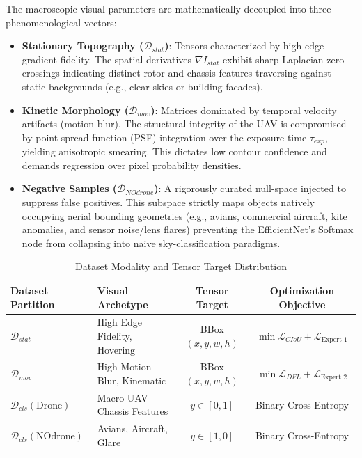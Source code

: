 \documentclass[11pt, letterpaper, oneside, openany]{book}
\begin{document}
The macroscopic visual parameters are mathematically decoupled into three phenomenological vectors:
\begin{itemize}
    \item \textbf{Stationary Topography ($\mathcal{D}_{stat}$)}: Tensors characterized by high edge-gradient fidelity. The spatial derivatives $\nabla I_{stat}$ exhibit sharp Laplacian zero-crossings indicating distinct rotor and chassis features traversing against static backgrounds (e.g., clear skies or building facades).
    \item \textbf{Kinetic Morphology ($\mathcal{D}_{mov}$)}: Matrices dominated by temporal velocity artifacts (motion blur). The structural integrity of the UAV is compromised by point-spread function (PSF) integration over the exposure time $\tau_{exp}$, yielding anisotropic smearing. This dictates low contour confidence and demands regression over pixel probability densities.
    \item \textbf{Negative Samples ($\mathcal{D}_{NOdrone}$)}: A rigorously curated null-space injected to suppress false positives. This subspace strictly maps objects natively occupying aerial bounding geometries (e.g., avians, commercial aircraft, kite anomalies, and sensor noise/lens flares) preventing the EfficientNet's Softmax node from collapsing into naive sky-classification paradigms.
\end{itemize}

\begin{table}[h]
\centering
\caption{Dataset Modality and Tensor Target Distribution}
\begin{tabular}{@{}llcc@{}}
\toprule
\textbf{Dataset Partition} & \textbf{Visual Archetype} & \textbf{Tensor Target} & \textbf{Optimization Objective} \\ \midrule
$\mathcal{D}_{stat}$ & High Edge Fidelity, Hovering & BBox $(x, y, w, h)$ & $\min \mathcal{L}_{CIoU} + \mathcal{L}_{\text{Expert } 1}$ \\
$\mathcal{D}_{mov}$ & High Motion Blur, Kinematic & BBox $(x, y, w, h)$ & $\min \mathcal{L}_{DFL} + \mathcal{L}_{\text{Expert } 2}$ \\
$\mathcal{D}_{cls}(\text{Drone})$ & Macro UAV Chassis Features & $y \in [0, 1]$ & Binary Cross-Entropy  \\
$\mathcal{D}_{cls}(\text{NOdrone})$ & Avians, Aircraft, Glare & $y \in [1, 0]$ & Binary Cross-Entropy \\ \bottomrule
\end{tabular}
\end{table}
\end{document}
